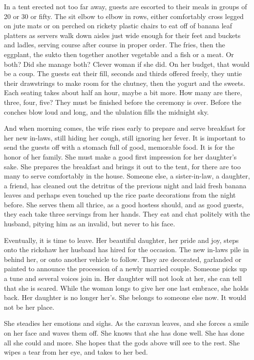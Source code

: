 \documentclass{amsart}
\begin{document}
In a tent erected not too far away, guests are escorted to their meals in groups of 20 or 30 or fifty. The sit elbow to elbow in rows, either comfortably cross legged on jute mats or on perched on rickety plastic chairs to eat off of banana leaf platters as servers walk down aisles just wide enough for their feet and buckets and ladles, serving course after course in proper order. The fries, then the eggplant, the sukto then together another vegetable and a fish or a meat. Or both? Did she manage both? Clever woman if she did. On her budget, that would be a coup. The guests eat their fill, seconds and thirds offered freely, they untie their drawstrings to make room for the chutney, then the yogurt and the sweets. Each seating takes about half an hour, maybe a bit more. How many are there, three, four, five? They must be finished before the ceremony is over. Before the conches blow loud and long, and the ululation fills the midnight sky. 

And when morning comes, the wife rises early to prepare and serve breakfast for her new in-laws, still hiding her cough, still ignoring her fever. It is important to send the guests off with a stomach full of good, memorable food. It is for the honor of her family. She must make a good first impression for her daughter's sake. She prepares the breakfast and brings it out to the tent, for there are too many to serve comfortably in the house. Someone else, a sister-in-law, a daughter, a friend, has cleaned out the detritus of the previous night and laid fresh banana leaves and perhaps even touched up the rice paste decorations from the night before. She serves them all thrice, as a good hostess should, and as good guests, they each take three servings from her hands. They eat and chat politely with the husband, pitying him as an invalid, but never to his face. 

Eventually, it is time to leave. Her beautiful daughter, her pride and joy, steps onto the rickshaw her husband has hired for the occasion. The new in-laws pile in behind her, or onto another vehicle to follow. They are decorated, garlanded or painted to announce the procession of a newly married couple. Someone picks up a tune and several voices join in. Her daughter will not look at her, she can tell that she is scared. While the woman longs to give her one last embrace, she holds back. Her daughter is no longer her's. She belongs to someone else now. It would not be her place. 

She steadies her emotions and sighs. As the caravan leaves, and she forces a smile on her face and waves them off. She knows that she has done well. She has done all she could and more. She hopes that the gods above will see to the rest. She wipes a tear from her eye, and takes to her bed. 
\end{document}
